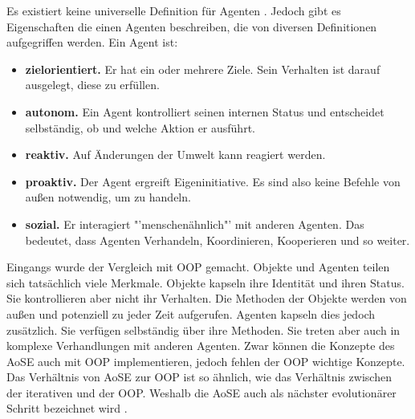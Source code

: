 Es existiert keine universelle Definition für Agenten \cite{book:padgham}. Jedoch gibt es Eigenschaften die einen Agenten beschreiben, die von diversen Definitionen aufgegriffen werden. Ein Agent ist:
\begin{itemize}
\item \textbf{zielorientiert.} Er hat ein oder mehrere Ziele. Sein Verhalten ist darauf ausgelegt, diese zu erfüllen.
\item \textbf{autonom.} Ein Agent kontrolliert seinen internen Status und entscheidet selbständig, ob und welche Aktion er ausführt.
\item \textbf{reaktiv.} Auf Änderungen der Umwelt kann reagiert werden.
\item \textbf{proaktiv.} Der Agent ergreift Eigeninitiative. Es sind also keine Befehle von außen notwendig, um zu handeln.
\item \textbf{sozial.} Er interagiert "'menschenähnlich"' mit anderen Agenten. Das bedeutet, dass Agenten Verhandeln, Koordinieren, Kooperieren und so weiter.
\end{itemize}\cite{book:padgham}\cite{book:jade}\cite{article:flexibleSoftware}

Eingangs wurde der Vergleich mit OOP gemacht. Objekte und Agenten teilen sich tatsächlich viele Merkmale. Objekte kapseln ihre Identität und ihren Status. Sie kontrollieren aber nicht ihr Verhalten. Die Methoden der Objekte werden von außen und potenziell zu jeder Zeit aufgerufen. Agenten kapseln dies jedoch zusätzlich. Sie verfügen selbständig über ihre Methoden. Sie treten aber auch in komplexe Verhandlungen mit anderen Agenten. Zwar können die Konzepte des AoSE auch mit OOP implementieren, jedoch fehlen der OOP wichtige Konzepte. \cite{article:flexibleSoftware} Das Verhältnis von AoSE zur OOP ist so ähnlich, wie das Verhältnis zwischen der iterativen und der OOP. Weshalb die AoSE auch als nächster evolutionärer Schritt bezeichnet wird \cite{article:objectsVsAgents}.
